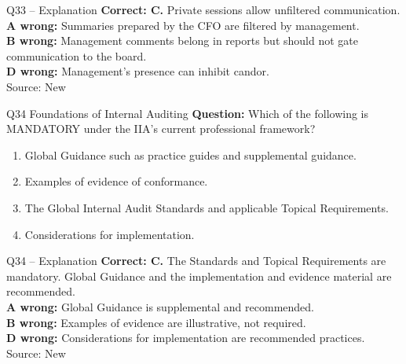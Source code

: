 \documentclass[aspectratio=169,10pt]{beamer}
\begin{document}
\begin{frame}[t]{Q33 -- Explanation}
	\footnotesize
	\textbf{Correct: C.} Private sessions allow unfiltered communication. \\[5pt]
\textbf{A wrong:} Summaries prepared by the CFO are filtered by management. \\[3pt]
\textbf{B wrong:} Management comments belong in reports but should not gate communication to the board. \\[3pt]
\textbf{D wrong:} Management's presence can inhibit candor. \\[3pt]
	\vfill {\tiny Source: New}
\end{frame}

\begin{frame}[t]{Q34 \hfill {\scriptsize Foundations of Internal Auditing}}
	\small
	\textbf{Question:} Which of the following is MANDATORY under the IIA's current professional framework?
	\begin{enumerate}[label=\Alph*.,itemsep=1pt,topsep=3pt]
			\item Global Guidance such as practice guides and supplemental guidance.
			\item Examples of evidence of conformance.
			\item The Global Internal Audit Standards and applicable Topical Requirements.
			\item Considerations for implementation.
	\end{enumerate}
\end{frame}

\begin{frame}[t]{Q34 -- Explanation}
	\footnotesize
	\textbf{Correct: C.} The Standards and Topical Requirements are mandatory. Global Guidance and the implementation and evidence material are recommended. \\[5pt]
\textbf{A wrong:} Global Guidance is supplemental and recommended. \\[3pt]
\textbf{B wrong:} Examples of evidence are illustrative, not required. \\[3pt]
\textbf{D wrong:} Considerations for implementation are recommended practices. \\[3pt]
	\vfill {\tiny Source: New}
\end{frame}
\end{document}
